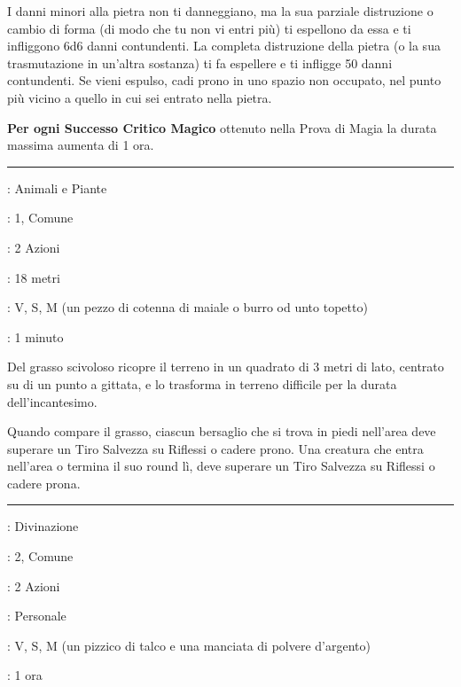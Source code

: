 \begin{multicols}{2}
I danni minori alla pietra non ti danneggiano, ma la sua parziale distruzione o cambio di forma (di modo che tu non vi entri più) ti espellono da essa e ti infliggono 6d6 danni contundenti. La completa distruzione della pietra (o la sua trasmutazione in un'altra sostanza) ti fa espellere e ti infligge 50 danni contundenti. Se vieni espulso, cadi prono in uno spazio non occupato, nel punto più vicino a quello in cui sei entrato nella pietra.

\textbf{Per ogni Successo Critico Magico} ottenuto nella Prova di Magia la durata massima aumenta di 1 ora.

\smallskip\noindent\rule{\linewidth}{2pt} \hypertarget{Unto}{}\smallskip{}
\noindent
\begin{description}[noitemsep, topsep=0pt, parsep=0pt, partopsep=0pt, leftmargin=0cm, labelwidth=2.8cm]
	\item[\textbf{Lista di Magia}]: Animali e Piante
	\item[\textbf{Livello}]: 1, Comune
	\item[\textbf{T. di Lancio}]: 2 Azioni
	\item[\textbf{Gittata}]: 18 metri
	\item[\textbf{Componenti}]: V, S, M (un pezzo di cotenna di maiale o burro od unto topetto)
	\item[\textbf{Durata}]: 1 minuto
\end{description}

Del grasso scivoloso ricopre il terreno in un quadrato di 3 metri di lato, centrato su di un punto a gittata, e lo trasforma in terreno difficile per la durata dell'incantesimo.

Quando compare il grasso, ciascun bersaglio che si trova in piedi nell'area deve superare un Tiro Salvezza su Riflessi o cadere prono. Una creatura che entra nell'area o termina il suo round lì, deve superare un Tiro Salvezza su Riflessi o cadere prona.

\smallskip\noindent\rule{\linewidth}{2pt} \hypertarget{Vedere l'invisibile}{}\smallskip{}
\noindent
\begin{description}[noitemsep, topsep=0pt, parsep=0pt, partopsep=0pt, leftmargin=0cm, labelwidth=2.8cm]
	\item[\textbf{Lista di Magia}]: Divinazione
	\item[\textbf{Livello}]: 2, Comune
	\item[\textbf{T. di Lancio}]: 2 Azioni
	\item[\textbf{Gittata}]: Personale
	\item[\textbf{Componenti}]: V, S, M (un pizzico di talco e una manciata di polvere d'argento)
	\item[\textbf{Durata}]: 1 ora
\end{description}


\end{multicols}
